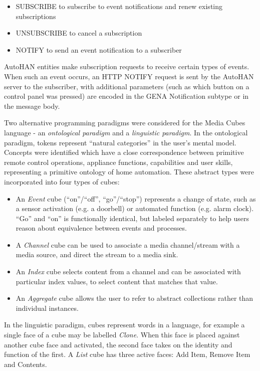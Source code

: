 \begin{itemize}
	\item SUBSCRIBE to subscribe to event notifications and renew existing subscriptions
	\item UNSUBSCRIBE to cancel a subscription
	\item NOTIFY to send an event notification to a subscriber
\end{itemize}

AutoHAN entities make subscription requests to receive certain types of events. When such an event occurs, an HTTP NOTIFY request is sent by the AutoHAN server to the subscriber, with additional parameters (such as which button on a control panel was pressed) are encoded in the \ac{GENA} Notification subtype or in the message body.

Two alternative programming paradigms were considered for the Media Cubes language - an \emph{ontological paradigm} and a \emph{linguistic paradigm}. In the ontological paradigm, tokens represent ``natural categories'' in the user's mental model. Concepts were identified which have a close correspondence between primitive remote control operations, appliance functions, capabilities and user skills, representing a primitive ontology of home automation. These abstract types were incorporated into four types of  cubes:

\begin{itemize}
	\item An \emph{Event} cube (``on''/``off'', ``go''/``stop'') represents a change of state, such as a sensor activation (e.g. a doorbell) or automated function (e.g. alarm clock). ``Go'' and ``on'' is functionally identical, but labeled separately to help users reason about equivalence between events and processes.
	\item A \emph{Channel} cube can be used to associate a media channel/stream with a media source, and direct the stream to a media sink.
	\item An \emph{Index} cube selects content from a channel and can be associated with particular index values, to select content that matches that value. 
	\item An \emph{Aggregate} cube allows the user to refer to abstract collections rather than individual instances.
\end{itemize}

In the linguistic paradigm, cubes represent words in a language, for example a single face of a cube may be labelled \emph{Clone}. When this face is placed against another cube face and activated, the second face takes on the identity and function of the first. A \emph{List} cube has three active faces: Add Item, Remove Item and Contents.

